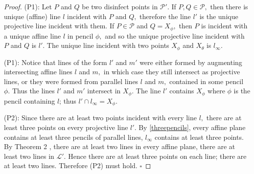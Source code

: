 \documentclass[
  twoside,
  12pt,
  letterpaper,
  fleqn]{article}
\theoremstyle{definition}
\theoremstyle{definition}
\theoremstyle{plain}
\theoremstyle{plain}
\theoremstyle{remark}
\begin{document}
\begin{proof}

(P1): Let \(P\) and \(Q\) be two disinfect points in \(\mathcal{P}'.\)
If \(P, Q\in \mathcal{P},\) then there is unique (affine) line \(l\)
incident with \(P\) and \(Q,\) therefore the line \(l'\) is the unique
projective line incident with them. If \(P\in \mathcal{P}\) and
\(Q=X_{\phi},\) then \(P\) is incident with a unique affine line \(l\)
in pencil \(\phi,\) and so the unique projective line incident with
\(P\) and \(Q\) is \(l'.\) The unique line incident with two points
\(X_\phi\) and \(X_\theta\) is \(l_\infty.\)

(P1): Notice that lines of the form \(l'\) and \(m'\) were either formed
by augmenting intersecting affine lines \(l\) and \(m,\) in which case
they still intersect as projective lines, or they were formed from
parallel lines \(l\) and \(m,\) contained in some pencil \(\phi.\) Thus
the lines \(l'\) and \(m'\) intersect in \(X_\phi.\) The line \(l'\)
contains \(X_\phi\) where \(\phi\) is the pencil containing \(l\); thus
\(l'\cap l_{\infty}=X_\phi.\)

(P2): Since there are at least two points incident with every line
\(l,\) there are at least three points on every projective line \(l'.\)
By \eqref{threepencils}, every affine plane contains at least three
pencils of parallel lines, \(l_{\infty}\) contains at least three
points. By Theorem 2 , there are at least two lines in every affine
plane, there are at least two lines in \(\mathcal{L}'.\) Hence there are
at least three points on each line; there are at least two lines.
Therefore (P2) must hold. \(\square\)

\end{proof}
\end{document}
